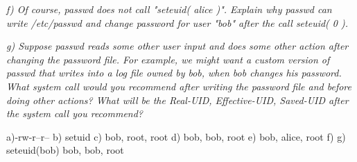 \noindent \textit{f) Of course, passwd does not call "seteuid( alice )". Explain why passwd can write /etc/passwd and change password for user "bob" after the call seteuid( 0 ).}\\

\noindent 

\noindent \textit{g) Suppose passwd reads some other user input and does some other action after changing the password file. For example, we might want a custom version of passwd that writes into a log file owned by bob, when bob changes his password. What system call would you recommend after writing the password file and before doing other actions? What will be the Real-UID, Effective-UID, Saved-UID after the system call you recommend?}\\

\noindent 


a)-rw-r--r--
b) setuid
c) bob, root, root
d) bob, bob, root 
e) bob, alice, root
f) 
g) seteuid(bob)
    bob, bob, root
